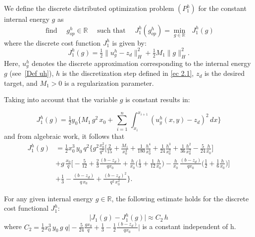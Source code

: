 \documentclass[axioms,article,submit,moreauthors]{Definitions/mdpi}
\newcommand{\dee}{d}
\begin{document}
We define the discrete distributed optimization problem ${(P^h_{1})}$ for the constant internal energy $g$ as 
\[ \text{ find }\quad {g^h_{op}}\in \mathbb{R}\quad\text{ such that }\quad
{J^h_1(g^h_{op})}=\min\limits_{g\in \mathbb{R}} \text{ }{J^h_{1}(g)}
\]
where the discrete cost function  ${J^h_{1}}$ is given by:
    \[{J^h_{1} }(g)=  \tfrac{1}{2} \lVert u^h_g - z_d \rVert^2_H +  \tfrac{1}{2} M_1 \lVert g \rVert ^2_{H} .\]
    {Here, $u^h_g$ denotes the discrete approximation corresponding to the internal energy $g$ (see~\eqref{Def uh}), $h$ is the discretization step defined in \eqref{ec 2.1}, $z_d$ is the desired target, and $M_1>0$ is a regularization parameter. }
    
    
    Taking into account that the variable $g$ is constant results in:
     
\begin{equation}
{J^h_{1}} (g)= \tfrac{1}{2} y_0 \Big\{M_1\,g^2 \,x_0 + \, \sum_{i=1}^n \, \int_{x_i}^{x_{i+1}} \left({u^h_g (x,y) }- z_d\right)^2 \,\dee x \Big \}
\end{equation}
 and from algebraic work, it follows that
\begin{equation}\label{J1h-explicito}   \begin{array}{rl}
    {J^h_{1}(g)}&= \frac{1}{2} x_0^3\, y_0 \,q^2 \Bigg\{g^2 \tfrac{x_0^2}{q^2} \Big[\frac{2}{15}+\tfrac{M_1}{x_0^4}+\frac{1}{180} \tfrac{h^4}{x_0^4}+\frac{1}{24}\tfrac{h^3}{x_0^3}+\frac{1}{36}\tfrac{h^2}{x_0^2}-\frac{5 }{24} \tfrac{h}{x_0}\Big] \\[0.35cm]
&    + g\,\tfrac{x_0}{q} \Big[- \frac{5}{12}+ \frac{2}{3} \tfrac{(b-z_d)}{q x_0}   + \tfrac{h}{x_0}  \Big( \frac{1}{3} +  \frac{1}{12}\tfrac{h}{x_0} \Big) -  \tfrac{h}{x_0} \,\tfrac{(b-z_d)}{qx_0} \Big(  \frac{1}{2} + \tfrac{1}{6}\tfrac{h}{x_0} \Big) \Big] \\[0.35cm]
 &   + \frac{1}{3} - \tfrac{(b-z_d)}{q\,x_0}  + \tfrac{(b-z_d)^2 }{q^2\,x_0^2}\Bigg\}. \end{array}
 \end{equation}
    

    
\begin{Lemma}    \label{Lema:J1(g)-J1h(g)}
{For any given internal energy $g \in \mathbb{R}$, the following estimate holds for the discrete cost functional $J^h_{1}$:}
    \begin{equation}\label{ec 3.3}
       \lvert J_1(g) - {J^h_{1}}(g)\rvert  \approx C_2 \, h 
    \end{equation}
   where  $C_2= \frac{1}{2}x_0^3\, y_0\,g\;  q \Big|-\frac{5}{24} \tfrac{g x_0}{q}+\tfrac{1}{3}-\tfrac{1}{2} \tfrac{(b-z_d)}{qx_0}\Big|$  {is a constant independent of h}.
    \end{Lemma}
  
\end{document}
